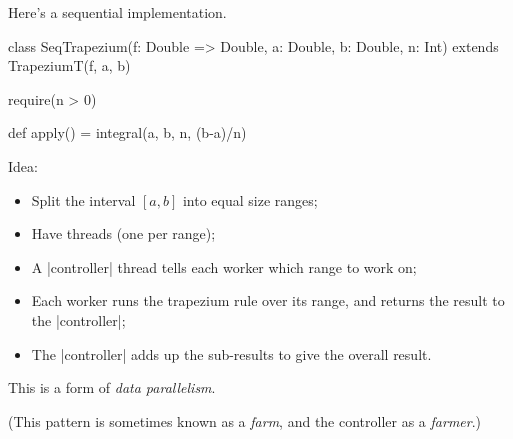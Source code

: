 
\begin{slide}

Here's a sequential implementation.
\begin{scala}
class SeqTrapezium(f: Double => Double, a: Double, b: Double, n: Int)
    extends TrapeziumT(f, a, b){
  require(n > 0)

  def apply() = integral(a, b, n, (b-a)/n)
}
\end{scala}
\end{slide}



\begin{slide}

Idea:
%
\begin{itemize}
\item
Split the interval $[a,b]$ into  equal size ranges;

\item
Have   threads (one per range);

\item
A |controller| thread tells each worker which range to work on;

\item
Each worker runs the trapezium rule over its range, and returns
the result to the |controller|;

\item
The |controller| adds up the sub-results to give the overall result.
\end{itemize}

This is a form of \emph{data parallelism}.

(This pattern is sometimes known as a \emph{farm}, and the controller as a
\emph{farmer}.) 
\end{slide}


